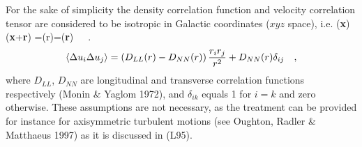 For the sake of simplicity the 
density correlation function and velocity correlation tensor
are considered to be isotropic in Galactic 
coordinates ($xyz$ space), i.e.
\be
\langle \rho ({\bf x}) \rho ({\bf x}+{\bf r}) \rangle=\xi(r)=\xi({\bf r})~~~.
\label{xifirst}
\ee 
\begin{equation}
\langle \Delta u_i \Delta u_j \rangle = \left( D_{LL}(r)-D_{NN}(r) \right) {r_i r_j \over r^2}
+D_{NN}(r) \delta_{ij}~~~,
\label{struc}
\end{equation}
where $D_{LL}$, $D_{NN}$ are longitudinal
and transverse correlation functions respectively (Monin \& Yaglom 1972), and 
$\delta_{ik}$ equals 1 for $i=k$ and zero otherwise. These assumptions
are not necessary, as the treatment can be provided for instance
for axisymmetric turbulent motions (see Oughton, Radler \& Matthaeus 1997)
as it is discussed in (L95). 

